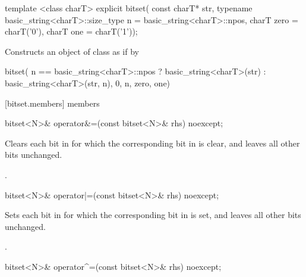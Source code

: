 \begin{itemdecl}
template <class charT>
  explicit bitset(
    const charT* str,
    typename basic_string<charT>::size_type n = basic_string<charT>::npos,
    charT zero = charT('0'), charT one = charT('1'));
\end{itemdecl}

\begin{itemdescr}
\pnum
\effects Constructs an object of class  as if by

\begin{codeblock}
bitset(
  n == basic_string<charT>::npos
    ? basic_string<charT>(str)
    : basic_string<charT>(str, n),
  0, n, zero, one)
\end{codeblock}

\end{itemdescr}


[bitset.members]{ members}

%
\begin{itemdecl}
bitset<N>& operator&=(const bitset<N>& rhs) noexcept;
\end{itemdecl}

\begin{itemdescr}
\pnum
\effects
Clears each bit in
for which the corresponding bit in  is clear, and leaves all other bits unchanged.

\pnum
\returns
{}.
\end{itemdescr}

%
\begin{itemdecl}
bitset<N>& operator|=(const bitset<N>& rhs) noexcept;
\end{itemdecl}

\begin{itemdescr}
\pnum
\effects
Sets each bit in
for which the corresponding bit in  is set, and leaves all other bits unchanged.

\pnum
\returns
{}.
\end{itemdescr}

%
\begin{itemdecl}
bitset<N>& operator^=(const bitset<N>& rhs) noexcept;
\end{itemdecl}

